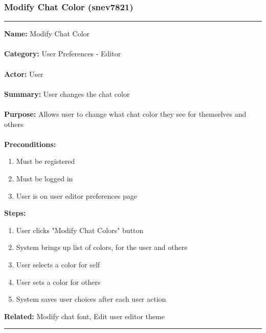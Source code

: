 \documentclass[11pt]{report}
\begin{document}
\subsubsection{Modify Chat Color (snev7821)}
\vspace{2pt}
\hrule
\vspace{8pt}
	\noindent\textbf{Name:} Modify Chat Color \\ \\
	\textbf{Category:} User Preferences - Editor  \\ \\
	\textbf{Actor:} User \\ \\
	\textbf{Summary:} User changes the chat color \\ \\
	\textbf{Purpose:} Allows user to change what chat color they see for themselves and others \\ \\
	\textbf{Preconditions:} 
	\begin{enumerate}
		\item Must be registered
		\item Must be logged in
		\item User is on user editor preferences page
	\end{enumerate}
	\textbf{Steps:}
	\begin{enumerate}
		\item User clicks "Modify Chat Colors" button
		\item System brings up list of colors, for the user and others
		\item User selects a color for self
		\item User sets a color for others
		\item System saves user choices after each user action
	\end{enumerate}
	\textbf{Related:} Modify chat font, Edit user editor theme
\vspace{8pt}
\hrule
\newpage
\end{document}
